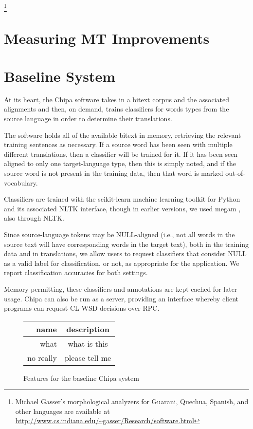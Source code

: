\footnote{Michael Gasser's morphological analyzers for Guarani, Quechua,
Spanish, and other languages are available at
\url{http://www.cs.indiana.edu/~gasser/Research/software.html} }

\section{Measuring MT Improvements}



\section{Baseline System}

At its heart, the Chipa software takes in a bitext corpus and the associated
alignments and then, on demand, trains classifiers for words types from the
source language in order to determine their translations.

The software holds all of the available bitext in memory, retrieving the
relevant training sentences as necessary.
If a source word has been seen with multiple different translations, then a
classifier will be trained for it. If it has been seen aligned to only one
target-language type, then this is simply noted, and if the source word is not
present in the training data, then that word is marked out-of-vocabulary.


Classifiers are trained with the scikit-learn machine learning toolkit
\cite{scikit-learn} for Python and its associated NLTK interface, though in
earlier versions, we used megam \cite{daume04cg-bfgs}, also through NLTK.

Since source-language tokens may be NULL-aligned (i.e., not all words in the
source text will have corresponding words in the target text), both in the
training data and in translations, we allow users to request classifiers that
consider NULL as a valid label for classification, or not, as appropriate for
the application. We report classification accuracies for both settings.

Memory permitting, these classifiers and annotations are kept cached for later
usage. Chipa can also be run as a server, providing an interface whereby client
programs can request CL-WSD decisions over RPC.

\begin{figure*}
  \begin{centering}
  \begin{tabular}{|r|c|}
    \hline
    name      & description  \\
    \hline
    what      & what is this \\
    no really & please tell me \\
    \hline
  \end{tabular}
  \end{centering}
  \caption{Features for the baseline Chipa system}
  \label{fig:baselinefeatures}
\end{figure*}

